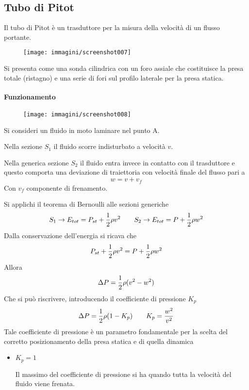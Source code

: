 \documentclass[a4paper, 15pt]{article}
\begin{document}
\subsection{Tubo di Pitot}
\begin{adjustwidth}{2in}{}	
	Il tubo di Pitot è un trasduttore per la misura della velocità di un flusso
	portante.
	\begin{figure}[H]
		\centering
		\texttt{[image: immagini/screenshot007]}
		\label{fig:screenshot007}
	\end{figure}
	
	Si presenta come una sonda cilindrica con un foro assiale che costituisce la presa totale (ristagno) e una serie di fori sul profilo
	laterale per la presa statica. 
	
	\paragraph{Funzionamento}
	\begin{figure}[H]
		\centering
		\texttt{[image: immagini/screenshot008]}
		\label{fig:screenshot008}
	\end{figure}
	Si consideri un fluido in moto laminare nel punto A. \newline 
	
	Nella sezione $S_1$ il fluido scorre indisturbato a velocità $v$. 
	
	Nella generica sezione $S_2$ il fluido entra invece in contatto con il trasduttore e questo comporta una deviazione di traiettoria con velocità finale del flusso pari a 
	\[w = v + v_f\]
	Con $v_f$ componente di frenamento. \newline 
	
	Si applichi il teorema di Bernoulli alle sezioni generiche
	\[S_1\rightarrow E_{tot} = P_{st} + {1\over2}\rho v^2 \qquad S_2\rightarrow E_{tot} = P + {1\over2}\rho w^2\]
	Dalla conservazione dell'energia si ricava che 
	\[P_{st} + {1\over2}\rho v^2 = P + {1\over2}\rho w^2\]
	Allora 
	\[\Delta P = {1\over2}\rho(v^2-w^2)\]
	Che si può riscrivere, introducendo il coefficiente di pressione $K_p$
	\[\Delta P = {1\over2}\rho(1-K_p) \qquad K_p = \dfrac{w^2}{v^2}\]
	Tale coefficiente di pressione è un parametro fondamentale per la scelta del corretto posizionamento della presa statica e di quella dinamica
	\begin{itemize}
		\item \(K_p = 1\)
		
		Il massimo del coefficiente di pressione si ha quando tutta la velocità del fluido viene frenata. 
		

\end{itemize}
\end{adjustwidth}
\end{document}
